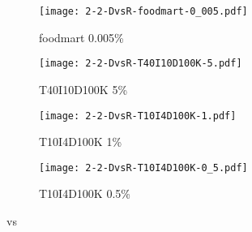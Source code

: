 \begin{figure}[htb]
   \centering
   \begin{subfigure}[b]{0.44\textwidth}
      \texttt{[image: 2-2-DvsR-foodmart-0\_005.pdf]}
      \caption{foodmart 0.005\%}
      \label{fig:2-1-foodmart0_005}
   \end{subfigure}%
   \hfill    
   \begin{subfigure}[b]{0.44\textwidth}
      \texttt{[image: 2-2-DvsR-T40I10D100K-5.pdf]}
      \caption{T40I10D100K 5\%}
      \label{fig:2-1-T40I10D100K-5}
   \end{subfigure}
   \hfill
   \begin{subfigure}[b]{0.44\textwidth}
      \texttt{[image: 2-2-DvsR-T10I4D100K-1.pdf]}
      \caption{T10I4D100K 1\%}
      \label{fig:2-1-T10I4D100K-1}
   \end{subfigure}
   \hfill    
   \begin{subfigure}[b]{0.44\textwidth}
      \texttt{[image: 2-2-DvsR-T10I4D100K-0\_5.pdf]}
      \caption{T10I4D100K 0.5\%}
      \label{fig:2-1-T10I4D100K-0_5}
   \end{subfigure}
   \caption{\D vs \R}
\label{fig:2-1-DvsR}
\end{figure}

